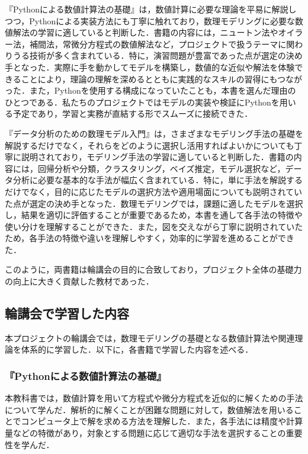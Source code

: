 『Pythonによる数値計算法の基礎』は，数値計算に必要な理論を平易に解説しつつ，Pythonによる実装方法にも丁寧に触れており，数理モデリングに必要な数値解法の学習に適していると判断した．書籍の内容には，ニュートン法やオイラー法，補間法，常微分方程式の数値解法など，プロジェクトで扱うテーマに関わりうる技術が多く含まれている．特に，演習問題が豊富であった点が選定の決め手となった．実際に手を動かしてモデルを構築し，数値的な近似や解法を体験できることにより，理論の理解を深めるとともに実践的なスキルの習得にもつながった．また，Pythonを使用する構成になっていたことも，本書を選んだ理由のひとつである．私たちのプロジェクトではモデルの実装や検証にPythonを用いる予定であり，学習と実務が直結する形でスムーズに接続できた．

『データ分析のための数理モデル入門』は，さまざまなモデリング手法の基礎を解説するだけでなく，それらをどのように選択し活用すればよいかについても丁寧に説明されており，モデリング手法の学習に適していると判断した．書籍の内容には，回帰分析や分類，クラスタリング，ベイズ推定，モデル選択など，データ分析に必要な基本的な手法が幅広く含まれている．特に，単に手法を解説するだけでなく，目的に応じたモデルの選択方法や適用場面についても説明されていた点が選定の決め手となった．数理モデリングでは，課題に適したモデルを選択し，結果を適切に評価することが重要であるため，本書を通して各手法の特徴や使い分けを理解することができた．また，図を交えながら丁寧に説明されていたため，各手法の特徴や違いを理解しやすく，効率的に学習を進めることができた．

このように，両書籍は輪講会の目的に合致しており，プロジェクト全体の基礎力の向上に大きく貢献した教材であった．

\subsection{輪講会で学習した内容}
本プロジェクトの輪講会では，数理モデリングの基礎となる数値計算法や関連理論を体系的に学習した．以下に，各書籍で学習した内容を述べる．

\subsubsection{『Pythonによる数値計算法の基礎』}
本教科書では，数値計算を用いて方程式や微分方程式を近似的に解くための手法について学んだ．解析的に解くことが困難な問題に対して，数値解法を用いることでコンピュータ上で解を求める方法を理解した．また，各手法には精度や計算量などの特徴があり，対象とする問題に応じて適切な手法を選択することの重要性を学んだ．

